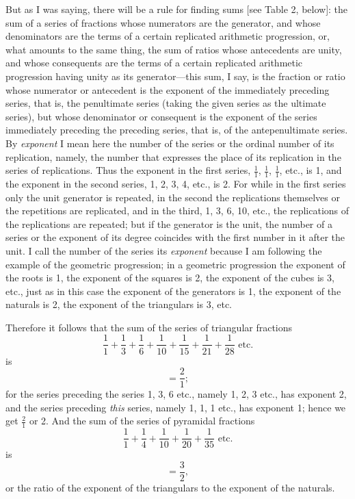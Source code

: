 \documentclass[twoside,openright]{article}
\begin{document}
But as I was saying, there will be a rule for finding sums [see Table 2, below]: the sum of a series of fractions whose numerators are the generator, and whose
denominators are the terms of a certain replicated arithmetic progression, or,
what amounts to the same thing, the sum of ratios whose antecedents are unity,
and whose consequents are the terms of a certain replicated arithmetic
progression having unity as its generator---this sum, I say, is the fraction
or ratio whose numerator or antecedent is the exponent of the immediately
preceding series, that is, the penultimate series (taking the given
series as the ultimate series), but whose denominator or consequent is the
exponent of the series immediately preceding the preceding series, that is, of
the antepenultimate series.  By {\em exponent} I mean here the number of the
series or the ordinal number of its replication, namely, the number that
expresses the place of its replication in the series of replications.  Thus
the exponent in the first series, $\frac{1}{1}$, $\frac{1}{1}$, $\frac{1}{1}$,
etc., is 1, and the exponent in the second series, 1, 2, 3, 4, etc., is 2.
For while in the first series only the unit generator is repeated, in the
second the replications themselves or the repetitions are replicated, and in
the third, 1, 3, 6, 10, etc., the replications of the replications are
repeated; but if the generator is the unit, the number of a series or the
exponent of its degree coincides with the first number in it after the unit.
I call the number of the series its  {\em exponent} because I am following the example of the geometric
progression; in a geometric progression the exponent of the roots is 1, the exponent of the squares is 2,
the exponent of the cubes is 3, etc., just as in this case the exponent of the generators is 1, the exponent of
the naturals is 2, the exponent of the triangulars is 3, etc.

Therefore it follows that the sum of the series of triangular fractions
$$\frac{1}{1} + \frac{1}{3} + \frac{1}{6} + \frac{1}{10} +\frac{1}{15} +
\frac{1}{21} +\frac{1}{28} \mbox{ etc.}$$
 is $$=\frac{2}{1};$$ for the series
preceding the series 1, 3, 6 etc., namely 1, 2, 3 etc., has exponent 2, and
the series preceding {\em this} series, namely 1, 1, 1 etc., has exponent 1;
hence we get $\frac{2}{1}$ or 2.  And the sum of the series of pyramidal
fractions $$\frac{1}{1} + \frac{1}{4} + \frac{1}{10} + \frac{1}{20}
+\frac{1}{35} \mbox{ etc.}$$ is $$=\frac{3}{2},$$ or the ratio of the exponent of
the triangulars to the exponent of the naturals.
\end{document}
